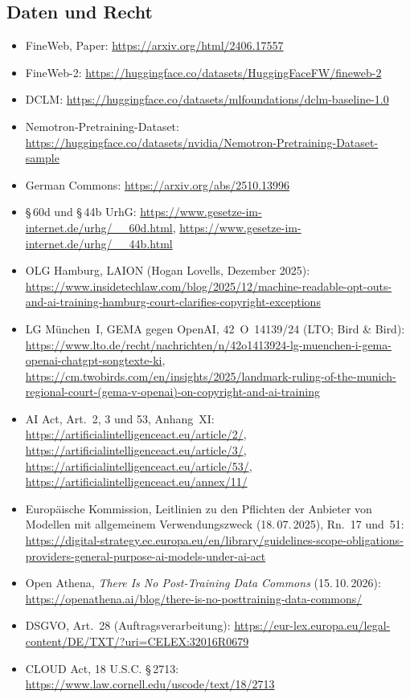 \documentclass[a4paper,11pt]{article}
\begin{document}
{\subsection*{Daten und Recht}
\begin{itemize}[itemsep=0.1em]
  \item FineWeb, Paper: \url{https://arxiv.org/html/2406.17557}
  \item FineWeb-2:
    \url{https://huggingface.co/datasets/HuggingFaceFW/fineweb-2}
  \item DCLM:
    \url{https://huggingface.co/datasets/mlfoundations/dclm-baseline-1.0}
  \item Nemotron-Pretraining-Dataset:
    \url{https://huggingface.co/datasets/nvidia/Nemotron-Pretraining-Dataset-sample}
  \item German Commons: \url{https://arxiv.org/abs/2510.13996}
  \item \S\,60d und \S\,44b UrhG:
    \url{https://www.gesetze-im-internet.de/urhg/__60d.html},
    \url{https://www.gesetze-im-internet.de/urhg/__44b.html}
  \item OLG Hamburg, LAION (Hogan Lovells, Dezember 2025):
    \url{https://www.insidetechlaw.com/blog/2025/12/machine-readable-opt-outs-and-ai-training-hamburg-court-clarifies-copyright-exceptions}
  \item LG München~I, GEMA gegen OpenAI, 42~O~14139/24 (LTO; Bird \& Bird):
    \url{https://www.lto.de/recht/nachrichten/n/42o1413924-lg-muenchen-i-gema-openai-chatgpt-songtexte-ki},
    \url{https://cm.twobirds.com/en/insights/2025/landmark-ruling-of-the-munich-regional-court-(gema-v-openai)-on-copyright-and-ai-training}
  \item AI Act, Art.~2, 3 und 53, Anhang~XI:
    \url{https://artificialintelligenceact.eu/article/2/},
    \url{https://artificialintelligenceact.eu/article/3/},
    \url{https://artificialintelligenceact.eu/article/53/},
    \url{https://artificialintelligenceact.eu/annex/11/}
  \item Europäische Kommission, Leitlinien zu den Pflichten der
    Anbieter von Modellen mit allgemeinem Verwendungszweck
    (18.\,07.\,2025), Rn.~17 und~51:
    \url{https://digital-strategy.ec.europa.eu/en/library/guidelines-scope-obligations-providers-general-purpose-ai-models-under-ai-act}
  \item Open Athena, \emph{There Is No Post-Training Data Commons}
    (15.\,10.\,2026):
    \url{https://openathena.ai/blog/there-is-no-posttraining-data-commons/}
  \item DSGVO, Art.~28 (Auftragsverarbeitung):
    \url{https://eur-lex.europa.eu/legal-content/DE/TXT/?uri=CELEX:32016R0679}
  \item CLOUD Act, 18 U.S.C. \S\,2713:
    \url{https://www.law.cornell.edu/uscode/text/18/2713}
\end{itemize}

}
\end{document}
